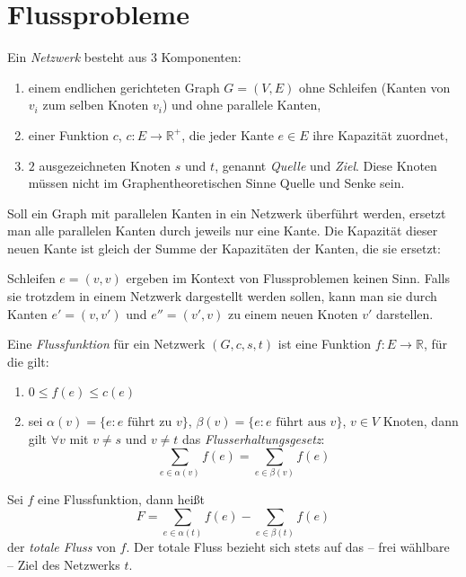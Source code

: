 \section{Flussprobleme}

\begin{definition}

    Ein \emph{Netzwerk} besteht aus $3$ Komponenten:
    \begin{enumerate}
        \item einem endlichen gerichteten Graph $G = (V, E)$ ohne Schleifen
            (Kanten von $v_i$ zum selben Knoten $v_i$) und ohne parallele Kanten,
        \item einer Funktion $c$, $c:E \rightarrow \mathbb{R}^{+}$, die jeder
            Kante $e \in E$ ihre Kapazität zuordnet,
        \item $2$ ausgezeichneten Knoten $s$ und $t$, genannt \emph{Quelle} und
            \emph{Ziel}. Diese Knoten müssen nicht im Graphentheoretischen Sinne
            Quelle und Senke sein.
    \end{enumerate}

    Soll ein Graph mit parallelen Kanten in ein Netzwerk überführt werden,
    ersetzt man alle parallelen Kanten durch jeweils nur eine Kante. Die
    Kapazität dieser neuen Kante ist gleich der Summe der Kapazitäten der
    Kanten, die sie ersetzt:
    
    Schleifen $e = (v, v)$ ergeben im Kontext von Flussproblemen keinen Sinn.
    Falls sie trotzdem in einem Netzwerk dargestellt werden sollen, kann man
    sie durch Kanten $e' = (v, v')$ und $e'' = (v', v)$ zu einem neuen Knoten
    $v'$ darstellen.
\end{definition}


\begin{definition}

    Eine \emph{Flussfunktion} für ein Netzwerk $(G, c, s, t)$ ist eine Funktion
    $f:E \rightarrow \mathbb{R}$, für die gilt:
    \begin{enumerate}
        \item $0 \leq f(e) \leq c(e)$
        \item sei $\alpha(v) = \{ e: e \text{ führt zu } v \}$, $\beta(v) = \{
            e: e \text{ führt aus } v \}$, $v \in V$ Knoten, dann gilt $\forall v$
            mit $v \neq s$ und $v \neq t$ das \emph{Flusserhaltungsgesetz}:
            $$ \sum_{e \in \alpha(v)} f(e) = \sum_{e \in \beta(v)} f(e) $$
    \end{enumerate}

    \noindent
    Sei $f$ eine Flussfunktion, dann heißt $$F = \sum_{e \in \alpha(t)} f(e)
    - \sum_{e \in \beta(t)} f(e)$$ der \emph{totale Fluss} von $f$. Der totale
    Fluss bezieht sich stets auf das -- frei wählbare -- Ziel des Netzwerks
    $t$.
\end{definition}


